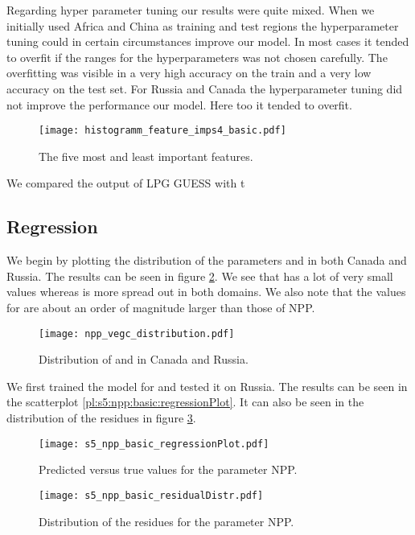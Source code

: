 Regarding hyper parameter tuning our results were quite mixed.
When we initially used Africa and China as training and test regions the hyperparameter tuning could
in certain circumstances improve our model. In most cases it tended to overfit if the ranges for the hyperparameters
was not chosen carefully. The overfitting was visible in a very high accuracy on the train and a very low accuracy
on the test set.
For Russia and Canada the hyperparameter tuning did not improve the performance our model. Here too
it tended to overfit.

\begin{figure}
  \centering
  \texttt{[image: histogramm\_feature\_imps4\_basic.pdf]}
  \caption{The five most and least important features.}
  \label{pl:histogramm_feature_imps4_basic}
\end{figure}

We compared the output of LPG GUESS with t

\subsection{Regression}

We begin by plotting the distribution of the parameters  and  in both Canada and Russia. The results can be
seen in figure \ref{pl:npp_vegc_distribution}. We see that  has a lot of very small values whereas  is more spread out
in both domains. We also note that the values for  are about an order of magnitude larger than those of NPP.
\begin{figure}[h]
  \centering
  \texttt{[image: npp\_vegc\_distribution.pdf]}
  \caption{Distribution of  and  in Canada and Russia.}
  \label{pl:npp_vegc_distribution}
\end{figure}

We first trained the model for  and tested it on Russia. The results 
can be seen in the scatterplot \ref{pl:s5:npp:basic:regressionPlot}. It can also be seen in the distribution
 of the residues in figure \ref{pl:s5:npp:basic:residualDistr}.
\begin{figure}[h]
  \centering
  \begin{minipage}{0.45\textwidth}
    \centering
    \texttt{[image: s5\_npp\_basic\_regressionPlot.pdf]}
    \caption{Predicted versus true values for the parameter NPP.}
    \label{pl:s5:npp:basic:regressionPlot}
  \end{minipage}
  \hfill
  \begin{minipage}{0.45\textwidth}
    \centering
    \texttt{[image: s5\_npp\_basic\_residualDistr.pdf]}
    \caption{Distribution of the residues for the parameter NPP.}
    \label{pl:s5:npp:basic:residualDistr}
  \end{minipage}
\end{figure}

